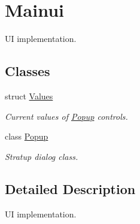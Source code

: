 \hypertarget{group__mainui}{}\section{Mainui}
\label{group__mainui}


UI implementation.  


\subsection*{Classes}
\begin{DoxyCompactItemize}
\item 
struct \hyperlink{structValues}{Values}
\begin{DoxyCompactList}\small\item\em Current values of \hyperlink{classPopup}{Popup} controls. \end{DoxyCompactList}\item 
class \hyperlink{classPopup}{Popup}
\begin{DoxyCompactList}\small\item\em Stratup dialog class. \end{DoxyCompactList}\end{DoxyCompactItemize}


\subsection{Detailed Description}
UI implementation. 


